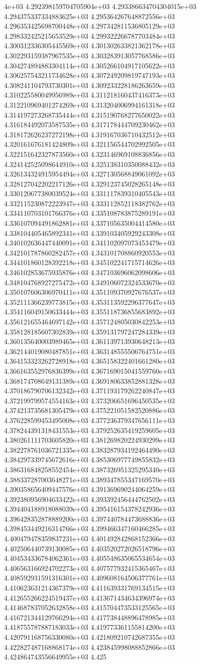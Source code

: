 4e+03	4.292398159704705904e+03	4.293386634704304015e+03	4.294375337334883625e+03	4.295364267648872556e+03	4.296353425698700448e+03	4.297342811536805129e+03	4.298332425215653529e+03	4.299322266787703484e+03	4.300312336305445569e+03	4.301302633821362178e+03	4.302293159387967535e+03	4.303283913057768586e+03	4.304274894883304114e+03	4.305266104917105622e+03	4.306257543211734628e+03	4.307249209819747193e+03	4.308241104793730301e+03	4.309233228186263659e+03	4.310225580049956989e+03	4.311218160437416373e+03	4.312210969401274269e+03	4.313204006994161318e+03	4.314197273268735444e+03	4.315190768277650022e+03	4.316184492073587535e+03	4.317178444709230462e+03	4.318172626237272198e+03	4.319167036710432512e+03	4.320161676181424809e+03	4.321156544702992505e+03	4.322151642327873560e+03	4.323146969108836856e+03	4.324142525098644910e+03	4.325138310350088432e+03	4.326134324915954494e+03	4.327130568849061092e+03	4.328127042202217126e+03	4.329123745028265148e+03	4.330120677380039524e+03	4.331117839310405543e+03	4.332115230872223947e+03	4.333112852118382762e+03	4.334110703101766376e+03	4.335108783875289191e+03	4.336107094491862881e+03	4.337105635004414580e+03	4.338104405465892341e+03	4.339103405929243308e+03	4.340102636447440091e+03	4.341102097073453479e+03	4.342101787860282457e+03	4.343101708860920553e+03	4.344101860128392218e+03	4.345102241715714626e+03	4.346102853675935876e+03	4.347103696062098606e+03	4.348104768927275472e+03	4.349106072324533670e+03	4.350107606306970411e+03	4.351109370927676537e+03	4.352111366239773815e+03	4.353113592296377647e+03	4.354116049150633444e+03	4.355118736855683892e+03	4.356121655464697142e+03	4.357124805030842253e+03	4.358128185607302839e+03	4.359131797247284339e+03	4.360135640003989465e+03	4.361139713930648213e+03	4.362144019080487851e+03	4.363148555506764751e+03	4.364153323262728918e+03	4.365158322401661280e+03	4.366163552976836399e+03	4.367169015041559760e+03	4.368174708649131389e+03	4.369180633852881328e+03	4.370186790706132342e+03	4.371193179262240847e+03	4.372199799574554163e+03	4.373206651696450535e+03	4.374213735681305479e+03	4.375221051582520886e+03	4.376228599453495008e+03	4.377236379347656111e+03	4.378244391318431553e+03	4.379252635419259605e+03	4.380261111703605820e+03	4.381269820224930299e+03	4.382278761036721335e+03	4.383287934192464490e+03	4.384297339745672616e+03	4.385306977749855832e+03	4.386316848258552454e+03	4.387326951325295340e+03	4.388337287003648271e+03	4.389347855347169570e+03	4.390358656409447576e+03	4.391369690244064259e+03	4.392380956904633422e+03	4.393392456444762502e+03	4.394404188918088039e+03	4.395416154378242936e+03	4.396428352878889200e+03	4.397440784473688836e+03	4.398453449216314766e+03	4.399466347160466285e+03	4.400479478359837231e+03	4.401492842868152366e+03	4.402506440739130085e+03	4.403520272026518796e+03	4.404534336784062361e+03	4.405548635065534654e+03	4.406563166924702273e+03	4.407577932415365467e+03	4.408592931591316301e+03	4.409608164506377761e+03	4.410623631214367379e+03	4.411639331769134515e+03	4.412655266224519437e+03	4.413671434634396974e+03	4.414687837052632858e+03	4.415704473533125565e+03	4.416721344129766294e+03	4.417738448896478985e+03	4.418755787887183033e+03	4.419773361155814200e+03	4.420791168756330080e+03	4.421809210742687355e+03	4.422827487168868174e+03	4.423845998088852866e+03	4.424864743556649955e+03	4.425